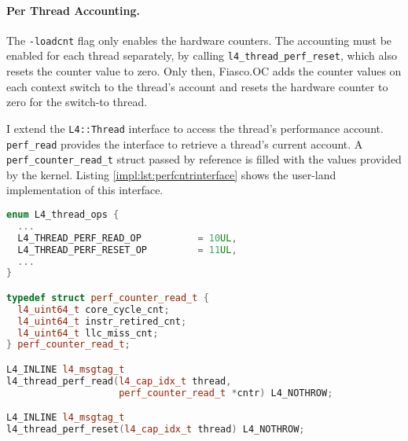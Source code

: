 \paragraph{Per Thread Accounting.}
The \texttt{-loadcnt} flag only enables the hardware counters.
The accounting must be enabled for each thread separately, by calling
\texttt{l4\_thread\_perf\_reset}, which also resets the counter value to zero.
Only then, Fiasco.OC adds the counter values on each context switch to the
thread's account and resets the hardware counter to zero for the switch-to thread.

I extend the \texttt{L4::Thread} interface to access the thread's performance
account.
\texttt{perf\_read} provides the interface to retrieve a thread's current
account.
A \texttt{perf\_counter\_read\_t} struct passed by reference is filled with the
values provided by the kernel.
Listing \ref{impl:lst:perfcntrinterface} shows the user-land implementation of
this interface.

\begin{lstlisting}[language=c++,
  caption={User land interface for retrieving and resetting a thread's
    performance counters; UTCB-pointer left out for brevity.},
  label={impl:lst:perfcntrinterface}]
enum L4_thread_ops {
  ...
  L4_THREAD_PERF_READ_OP	      = 10UL,
  L4_THREAD_PERF_RESET_OP	      =	11UL,
  ...
}

typedef struct perf_counter_read_t {
  l4_uint64_t core_cycle_cnt;
  l4_uint64_t instr_retired_cnt;
  l4_uint64_t llc_miss_cnt;
} perf_counter_read_t;

L4_INLINE l4_msgtag_t
l4_thread_perf_read(l4_cap_idx_t thread,
                    perf_counter_read_t *cntr) L4_NOTHROW;

L4_INLINE l4_msgtag_t
l4_thread_perf_reset(l4_cap_idx_t thread) L4_NOTHROW;
\end{lstlisting}
